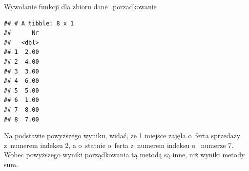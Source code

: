 \documentclass[12pt,a4paper]{report}
\begin{document}
{\begin{Shaded}
\begin{Highlighting}[]
    \NormalTok{\}}
    \NormalTok{x[,}\NormalTok{] <-}
    \NormalTok{:}
    \NormalTok{\{}
      \NormalTok{x[i,}\NormalTok{(x)]=}\NormalTok{-(odleg[i,}\NormalTok{]/d_0)}
    \NormalTok{\}}
    \NormalTok{x<-x[}\NormalTok{(-x$zmienna_syntetyczna),]}
    \NormalTok{(x[}\NormalTok{])}
    \NormalTok{\}}
\end{Highlighting}
\end{Shaded}%
Wywołanie funkcji dla zbioru dane\_porzadkowanie 
\begin{Shaded}
\begin{Highlighting}[]
\end{Highlighting}
\end{Shaded}
\begin{verbatim}
## # A tibble: 8 x 1
##      Nr
##   <dbl>
## 1  2.00
## 2  4.00
## 3  3.00
## 4  6.00
## 5  5.00
## 6  1.00
## 7  8.00
## 8  7.00
\end{verbatim}
Na podstawie powyższego wyniku, widać, że 1 miejsce zajęła o~ferta
sprzedaży z~numerem indeksu 2, a o~statnie o~ferta z~numerem indeksu o~
numerze 7. Wobec powyższego wyniki porządkowania tą metodą są inne, niż wyniki metody sum. 
}
\end{document}
